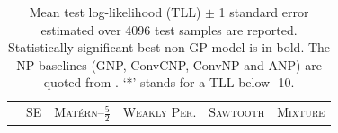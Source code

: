 \begin{table}[h]
	\label{tab:app:1d_regression}
	\small
	\centering
	\caption{
		Mean test log-likelihood (TLL) $\pm$ 1 standard error estimated over 4096 test samples are reported.
		Statistically significant best non-GP model is in bold.
		The NP baselines (GNP, ConvCNP, ConvNP and ANP) are quoted from \textcite{bruinsma2020Gaussian}.
		`*' stands for a TLL below -10.}

	\begin{tabular}{lccccc}
		\toprule
		                                & \multicolumn{1}{c}{\scshape SE}                       & \multicolumn{1}{c}{\scshape Mat\'ern--$\frac52$}      & \multicolumn{1}{c}{\scshape Weakly Per.}   & \multicolumn{1}{c}{\scshape Sawtooth}                 & \multicolumn{1}{c}{\scshape Mixture}                  \\


\end{tabular}
\end{table}
